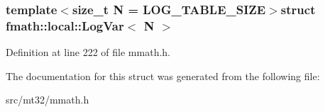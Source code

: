 \subsubsection*{template$<$size\-\_\-t N = L\-O\-G\-\_\-\-T\-A\-B\-L\-E\-\_\-\-S\-I\-Z\-E$>$struct fmath\-::local\-::\-Log\-Var$<$ N $>$}



Definition at line 222 of file mmath.\-h.



The documentation for this struct was generated from the following file\-:\begin{DoxyCompactItemize}
\item 
src/mt32/mmath.\-h\end{DoxyCompactItemize}
